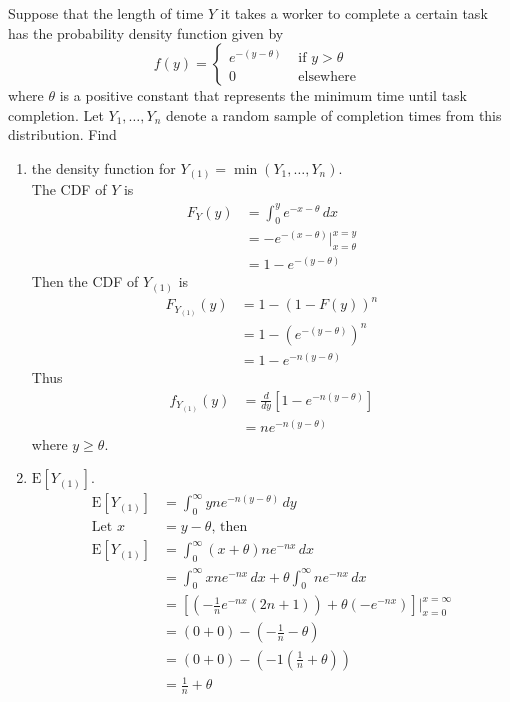 \documentclass[12pt]{article}
\newcommand{\ques}[1]{\noindent {\bf Question #1: }}
\newcommand{\expe}[1]{\mathrm{E}[#1]}
\begin{document}
\newpage
\ques{6.88} Suppose that the length of time $Y$ it takes a worker to complete a certain task has the probability density function given by 
$$ f(y) = \begin{cases} e^{-(y-\theta)} &\text{ if } y > \theta \\ 0 &\text{ elsewhere } \end{cases} $$ 
where $\theta$ is a positive constant that represents the minimum time until task completion. Let $Y_1,\dots,Y_n$ denote a random sample of completion times from this distribution. Find 
\begin{enumerate} 
\item the density function for $Y_{(1)} = \min(Y_1,\dots,Y_n)$. \\
The CDF of $Y$ is $$ \begin{aligned} 
F_Y(y) &= \int_0^y e^{-x - \theta} \, dx \\ &= -e^{-(x-\theta)} \Bigg|_{x = \theta}^{x = y} \\ &= 1 - e^{-(y-\theta)} 
\end{aligned} $$ Then the CDF of $Y_{(1)}$ is $$ \begin{aligned} 
F_{Y_{(1)}}(y) &= 1 - (1 - F(y))^n \\ &= 1 - (e^{-(y-\theta)})^n \\ &= 1 - e^{-n(y-\theta)} \end{aligned} $$ Thus 
$$ \begin{aligned} 
f_{Y_{(1)}}(y) &= \frac{d}{dy} [1 - e^{-n(y - \theta)}] \\ &= ne^{-n(y - \theta)} \end{aligned} $$ where $y \geq \theta$. 

\item $\expe{Y_{(1)}}$. 
$$ \begin{aligned} 
\expe{Y_{(1)}} &= \int_0^\infty y ne^{-n(y-\theta)} \, dy \\ \text{Let } x &= y - \theta \text{, then} \\ \expe{Y_{(1)}} &= \int_0^\infty (x + \theta) ne^{-nx} \, dx \\ &= \int_0^\infty xne^{-nx} \, dx + \theta \int_0^\infty ne^{-nx} \, dx \\ &= \left[\left( -\frac{1}{n}e^{-nx}(2n+1)\right) + \theta\left(-e^{-nx}\right)\right]\Bigg|_{x = 0}^{x = \infty} \\ &= (0 + 0) - (-\frac{1}{n} - \theta) \\ &= (0 + 0) - (-1(\frac{1}{n} + \theta)) \\ &= \frac{1}{n} + \theta
\end{aligned} $$ 

\end{enumerate} 
\end{document}
